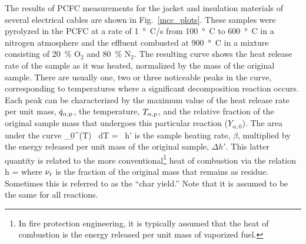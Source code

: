 \documentclass[11pt]{book}
\begin{document}
The results of PCFC measurements for the jacket and insulation materials of several electrical cables are shown in Fig.~\ref{mcc_plots}. These samples were pyrolyzed in the PCFC at a rate of 1~\si{\degree C}/s from 100~\si{\degree C} to 600~\si{\degree C} in a nitrogen atmosphere and the effluent combusted at 900~\si{\degree C} in a mixture consisting of 20~\% O$_2$ and 80~\% N$_2$. The resulting curve shows the heat release rate of the sample as it was heated, normalized by the mass of the original sample. There are usually one, two or three noticeable peaks in the curve, corresponding to temperatures where a significant decomposition reaction occurs. Each peak can be characterized by the maximum value of the heat release rate per unit mass, $\dot{q}_{\alpha,{\rm p}}$, the temperature, $T_{\alpha,{\rm p}}$, and the relative fraction of the original sample mass that undergoes this particular reaction ($Y_{\alpha,0}$). The area under the curve
\be
   \int_0^\infty {}(T) \, dT = \beta \, \Delta h'
\ee
is the sample heating rate, $\beta$, multiplied by the energy released per unit mass of the original sample, $\Delta h'$. This latter quantity is related to the more conventional\footnote{In fire protection engineering, it is typically assumed that the heat of combustion is the energy released per unit mass of vaporized fuel.} heat of combustion via the relation
\be
   \Delta h = 
\ee
where $\nu_{\rm r}$ is the fraction of the original mass that remains as residue. Sometimes this is referred to as the ``char yield.'' Note that it is assumed to be the same for all reactions.
\end{document}

